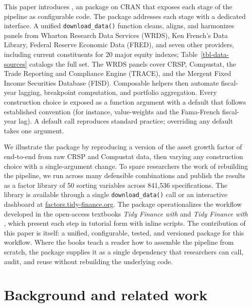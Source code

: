 \documentclass[
  article]{jss}
\begin{document}
This paper introduces , an  package on CRAN
that exposes each stage of the pipeline as configurable code. The
package addresses each stage with a dedicated interface. A unified
\texttt{download\_data()} function cleans, aligns, and harmonizes panels
from Wharton Research Data Services (WRDS), Ken French's Data Library,
Federal Reserve Economic Data (FRED), and seven other providers,
including current constituents for 20 major equity indexes;
Table~\ref{tbl-data-sources} catalogs the full set. The WRDS panels
cover CRSP, Compustat, the Trade Reporting and Compliance Engine
(TRACE), and the Mergent Fixed Income Securities Database (FISD).
Composable helpers then automate fiscal-year lagging, breakpoint
computation, and portfolio aggregation. Every construction choice is
exposed as a function argument with a default that follows established
convention (for instance, value-weights and the Fama-French fiscal-year
lag). A default call reproduces standard practice; overriding any
default takes one argument.

We illustrate the package by reproducing a version of the asset growth
factor of \citet{cooper.2008} end-to-end from raw CRSP and Compustat
data, then varying any construction choice with a single-argument
change. To spare researchers the work of rebuilding the pipeline, we run
 across many defensible combinations and publish the
results as a factor library of 50 sorting variables across 841,536
specifications. The library is available through a single
\texttt{download\_data()} call or an interactive dashboard at
\href{https://factors.tidy-finance.org}{factors.tidy-finance.org}. The
package operationalizes the workflow developed in the open-access
textbooks \emph{Tidy Finance with } \citep{scheuch.2023} and
\emph{Tidy Finance with } \citep{scheuch.2024}, which
present each step in tutorial form with inline scripts. The contribution
of this paper is  itself: a unified, configurable,
tested, and versioned  package for this workflow. Where the
books teach a reader how to assemble the pipeline from scratch, the
package supplies it as a single dependency that researchers can call,
audit, and reuse without rebuilding the underlying code.

\section{Background and related work}\label{sec-background}
\end{document}
